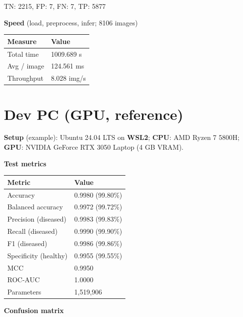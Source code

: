 \documentclass[a4paper,onesided,12pt]{report}
\begin{document}
TN: 2215, FP: 7, FN: 7, TP: 5877

\textbf{Speed} (load, preprocess, infer; 8106 images)

\begin{table}[h!]
\begin{center}
\begin{tabular}{|l|l|}
\hline
\textbf{Measure} & \textbf{Value} \\
\hline
Total time & 1009.689 s \\
\hline
Avg / image & 124.561 ms \\
\hline
Throughput & 8.028 img/s \\
\hline
\end{tabular}
\end{center}
\end{table}

\section{Dev PC (GPU, reference)}

\textbf{Setup} (example): Ubuntu 24.04 LTS on \textbf{WSL2}; \textbf{CPU}: AMD Ryzen 7 5800H; \textbf{GPU}: NVIDIA GeForce RTX 3050 Laptop (4 GB VRAM).

\textbf{Test metrics}

\begin{table}[h!]
\begin{center}
\begin{tabular}{|l|l|}
\hline
\textbf{Metric} & \textbf{Value} \\
\hline
Accuracy & 0.9980 (99.80\%) \\
\hline
Balanced accuracy & 0.9972 (99.72\%) \\
\hline
Precision (diseased) & 0.9983 (99.83\%) \\
\hline
Recall (diseased) & 0.9990 (99.90\%) \\
\hline
F1 (diseased) & 0.9986 (99.86\%) \\
\hline
Specificity (healthy) & 0.9955 (99.55\%) \\
\hline
MCC & 0.9950 \\
\hline
ROC-AUC & 1.0000 \\
\hline
Parameters & 1,519,906 \\
\hline
\end{tabular}
\end{center}
\end{table}

\textbf{Confusion matrix}
\end{document}
